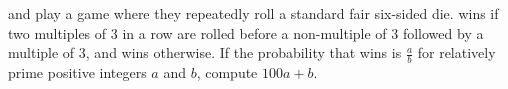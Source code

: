  and  play a game where they repeatedly roll a standard fair six-sided die.  wins if two multiples of $3$ in a row are rolled before a non-multiple of $3$ followed by a multiple of $3$, and  wins otherwise. If the probability that  wins is $\frac{a}{b}$ for relatively prime positive integers $a$ and $b$, compute $100a + b$.
